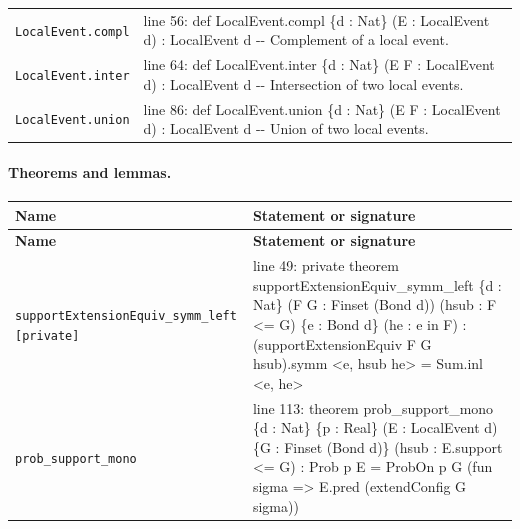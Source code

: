 \documentclass[10pt]{article}
\begin{document}
\begin{longtable}{>{\raggedright\arraybackslash}p{} >{\raggedright\arraybackslash}p{}}
\texttt{LocalEvent.\allowbreak{}compl} & {\ttfamily\scriptsize line 56:\allowbreak{} def LocalEvent.\allowbreak{}compl \{d :\allowbreak{} Nat\} (\allowbreak{}E :\allowbreak{} LocalEvent d)\allowbreak{} :\allowbreak{} LocalEvent d -\allowbreak{}-\allowbreak{} Complement of a local event.\allowbreak{}} \\[0.45em]
\texttt{LocalEvent.\allowbreak{}inter} & {\ttfamily\scriptsize line 64:\allowbreak{} def LocalEvent.\allowbreak{}inter \{d :\allowbreak{} Nat\} (\allowbreak{}E F :\allowbreak{} LocalEvent d)\allowbreak{} :\allowbreak{} LocalEvent d -\allowbreak{}-\allowbreak{} Intersection of two local events.\allowbreak{}} \\[0.45em]
\texttt{LocalEvent.\allowbreak{}union} & {\ttfamily\scriptsize line 86:\allowbreak{} def LocalEvent.\allowbreak{}union \{d :\allowbreak{} Nat\} (\allowbreak{}E F :\allowbreak{} LocalEvent d)\allowbreak{} :\allowbreak{} LocalEvent d -\allowbreak{}-\allowbreak{} Union of two local events.\allowbreak{}} \\[0.45em]
\end{longtable}

\paragraph{Theorems and lemmas.}
\begin{longtable}{>{\raggedright\arraybackslash}p{} >{\raggedright\arraybackslash}p{}}
\textbf{Name} & \textbf{Statement or signature} \\
\hline
\endfirsthead
\textbf{Name} & \textbf{Statement or signature} \\
\hline
\endhead
\texttt{supportExtensionEquiv\_\allowbreak{}symm\_\allowbreak{}left [private]} & {\ttfamily\scriptsize line 49:\allowbreak{} private theorem supportExtensionEquiv\_\allowbreak{}symm\_\allowbreak{}left \{d :\allowbreak{} Nat\} (\allowbreak{}F G :\allowbreak{} Finset (\allowbreak{}Bond d)\allowbreak{})\allowbreak{} (\allowbreak{}hsub :\allowbreak{} F <=\allowbreak{} G)\allowbreak{} \{e :\allowbreak{} Bond d\} (\allowbreak{}he :\allowbreak{} e in F)\allowbreak{} :\allowbreak{} (\allowbreak{}supportExtensionEquiv F G hsub)\allowbreak{}.\allowbreak{}symm <e,\allowbreak{} hsub he> =\allowbreak{} Sum.\allowbreak{}inl <e,\allowbreak{} he>} \\[0.45em]
\texttt{prob\_\allowbreak{}support\_\allowbreak{}mono} & {\ttfamily\scriptsize line 113:\allowbreak{} theorem prob\_\allowbreak{}support\_\allowbreak{}mono \{d :\allowbreak{} Nat\} \{p :\allowbreak{} Real\} (\allowbreak{}E :\allowbreak{} LocalEvent d)\allowbreak{} \{G :\allowbreak{} Finset (\allowbreak{}Bond d)\allowbreak{}\} (\allowbreak{}hsub :\allowbreak{} E.\allowbreak{}support <=\allowbreak{} G)\allowbreak{} :\allowbreak{} Prob p E =\allowbreak{} ProbOn p G (\allowbreak{}fun sigma =\allowbreak{}> E.\allowbreak{}pred (\allowbreak{}extendConfig G sigma)\allowbreak{})\allowbreak{}} \\[0.45em]
\end{longtable}
\end{document}
